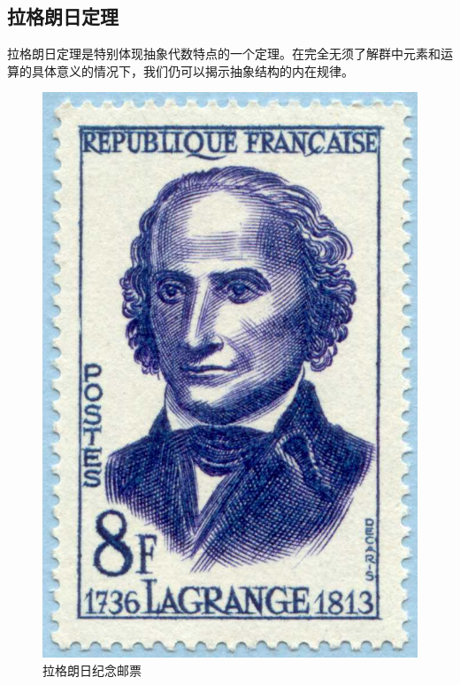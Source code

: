 \documentclass[b5paper]{ctexart}
\begin{document}
\subsection{拉格朗日定理}

拉格朗日定理是特别体现抽象代数特点的一个定理。在完全无须了解群中元素和运算的具体意义的情况下，我们仍可以揭示抽象结构的内在规律。

\begin{figure}
 \centering
 \includegraphics[scale=1.5]{img/lagrange.jpg}
 \captionsetup{labelformat=empty}
 \caption{拉格朗日纪念邮票}
 \label{fig:Lagrange}
\end{figure}
\end{document}
